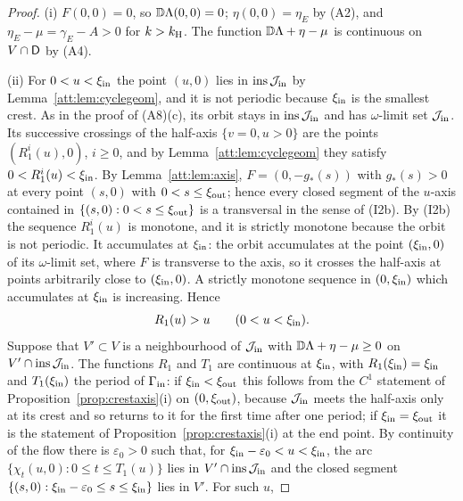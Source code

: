 \begin{proof}
(i) $F(0,0)=0$, so $\mathbb D\Lambda(0,0)=0$; $\eta(0,0)=\eta_E$ by (A2), and $\eta_E-\mu=\gamma_E-A>0$ for $k>k_{\mathrm H}$. The function $\mathbb D\Lambda+\eta-\mu$ is continuous on $V\cap\mathsf D$ by (A4).

(ii) For $0<u<\xi_{\rm in}$ the point $(u,0)$ lies in $\operatorname{ins}\mathcal J_{\rm in}$ by Lemma~\ref{att:lem:cyclegeom}, and it is not periodic because $\xi_{\rm in}$ is the smallest crest. As in the proof of (A8)(c), its orbit stays in $\operatorname{ins}\mathcal J_{\rm in}$ and has $\omega$-limit set $\mathcal J_{\rm in}$. Its successive crossings of the half-axis $\{v=0,u>0\}$ are the points $(R_1^i(u),0)$, $i\ge0$, and by Lemma~\ref{att:lem:cyclegeom} they satisfy $0<R_1^i(u)<\xi_{\rm in}$. By Lemma~\ref{att:lem:axis}, $F=(0,-g_\ast(s))$ with $g_\ast(s)>0$ at every point $(s,0)$ with $0<s\le\xi_{\rm out}$; hence every closed segment of the $u$-axis contained in $\{(s,0):0<s\le\xi_{\rm out}\}$ is a transversal in the sense of (I2b). By (I2b) the sequence $R_1^i(u)$ is monotone, and it is strictly monotone because the orbit is not periodic. It accumulates at $\xi_{\rm in}$: the orbit accumulates at the point $(\xi_{\rm in},0)$ of its $\omega$-limit set, where $F$ is transverse to the axis, so it crosses the half-axis at points arbitrarily close to $(\xi_{\rm in},0)$. A strictly monotone sequence in $(0,\xi_{\rm in})$ which accumulates at $\xi_{\rm in}$ is increasing. Hence
\begin{equation}\label{att:eq:outward}
R_1(u)>u\qquad(0<u<\xi_{\rm in}).
\end{equation}
Suppose that $V'\subset V$ is a neighbourhood of $\mathcal J_{\rm in}$ with $\mathbb D\Lambda+\eta-\mu\ge0$ on $V'\cap\operatorname{ins}\mathcal J_{\rm in}$. The functions $R_1$ and $T_1$ are continuous at $\xi_{\rm in}$, with $R_1(\xi_{\rm in})=\xi_{\rm in}$ and $T_1(\xi_{\rm in})$ the period of $\Gamma_{\rm in}$: if $\xi_{\rm in}<\xi_{\rm out}$ this follows from the $C^1$ statement of Proposition~\ref{prop:crestaxis}(i) on $(0,\xi_{\rm out})$, because $\mathcal J_{\rm in}$ meets the half-axis only at its crest and so returns to it for the first time after one period; if $\xi_{\rm in}=\xi_{\rm out}$ it is the statement of Proposition~\ref{prop:crestaxis}(i) at the end point. By continuity of the flow there is $\varepsilon_0>0$ such that, for $\xi_{\rm in}-\varepsilon_0<u<\xi_{\rm in}$, the arc $\{\chi_t(u,0):0\le t\le T_1(u)\}$ lies in $V'\cap\operatorname{ins}\mathcal J_{\rm in}$ and the closed segment $\{(s,0):\xi_{\rm in}-\varepsilon_0\le s\le\xi_{\rm in}\}$ lies in $V'$. For such $u$,

\end{proof}
